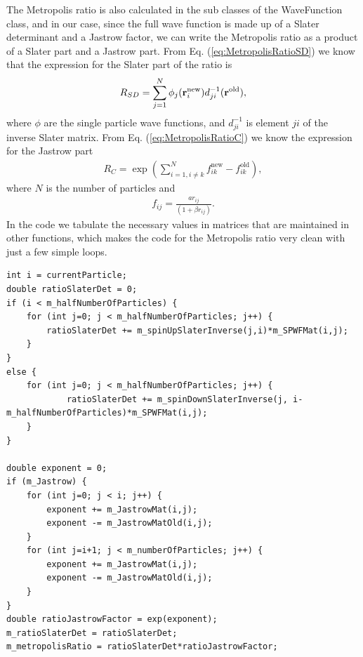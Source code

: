 \documentclass[../main.tex]{subfiles}
\begin{document}
The Metropolis ratio is also calculated in the sub classes of the WaveFunction class, and in our case, since the full wave function is made up of a Slater determinant and a Jastrow factor, we can write the Metropolis ratio as a product of a Slater part and a Jastrow part. From Eq. (\ref{eq:MetropolisRatioSD}) we know that the expression for the Slater part of the ratio is
\begin{align}
    R_{SD} = \sum_{j=1}^N \phi_j({\bf r}_i^{\textrm{new}}) d_{ji}^{-1}({\bf r}^{\textrm{old}}),
\end{align}
where $\phi$ are the single particle wave functions, and $d_{ji}^{-1}$ is element $ji$ of the inverse Slater matrix. From Eq. (\ref{eq:MetropolisRatioC}) we know the expression for the Jastrow part
\begin{align}
    R_{C} = \exp\left(\sum_{i=1, i\neq k}^{N} f_{ik}^{\textrm{new}} - f_{ik}^{\textrm{old}}\right),
\end{align}
where $N$ is the number of particles and
\begin{align}
    f_{ij} = \frac{a r_{ij}}{(1+\beta r_{ij})}.
\end{align}
In the code we tabulate the necessary values in matrices that are maintained in other functions, which makes the code for the Metropolis ratio very clean with just a few simple loops.
\lstset{language=c++}
\begin{lstlisting}[caption={The computation of the Metropolis ratio when the full wave function consists of a Slater determinant and a Jastrow factor. The ratio can be split into a Slater part and a Jastrow part which are multiplied together to form the full ratio. The "m\_spinUpSlaterInverse" matrix is the inverse of the spin up Slater matrix, and similarly for the spin down matrix, while "m\_SPWFMat" is a matrix containing the single particle wave functions, i.e. it is the spin up and spin down Slater matrices stored together in one matrix. The "m\_JastrowMat" matrix contains the exponent of the Jastrow factor for all particle pairs for the trial state, while the "m\_JastrowMat" is the same matrix, but for the last accepted state (i.e. the state before the trial state).}]
int i = currentParticle;
double ratioSlaterDet = 0;
if (i < m_halfNumberOfParticles) {
    for (int j=0; j < m_halfNumberOfParticles; j++) {
        ratioSlaterDet += m_spinUpSlaterInverse(j,i)*m_SPWFMat(i,j);
    }
}
else {
    for (int j=0; j < m_halfNumberOfParticles; j++) {
            ratioSlaterDet += m_spinDownSlaterInverse(j, i-m_halfNumberOfParticles)*m_SPWFMat(i,j);
    }
}
    
double exponent = 0;
if (m_Jastrow) {
    for (int j=0; j < i; j++) {
        exponent += m_JastrowMat(i,j);
        exponent -= m_JastrowMatOld(i,j);
    }
    for (int j=i+1; j < m_numberOfParticles; j++) {
        exponent += m_JastrowMat(i,j);
        exponent -= m_JastrowMatOld(i,j);
    }
}
double ratioJastrowFactor = exp(exponent);
m_ratioSlaterDet = ratioSlaterDet;
m_metropolisRatio = ratioSlaterDet*ratioJastrowFactor;
\end{lstlisting}
\end{document}
